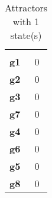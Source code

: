 

\begin{table}[ht]
\begin{center}
\caption{Attractors with 1 state(s)}
\begin{tabularx}{\linewidth}{l>{\centering\arraybackslash}X}\hline
	&	 \multicolumn{1}{c}{Attr. 1} \\
\textbf{g1}	&	\cellcolor[gray]{0.6}0\\
\textbf{g2}	&	\cellcolor[gray]{0.6}0\\
\textbf{g3}	&	\cellcolor[gray]{0.6}0\\
\textbf{g7}	&	\cellcolor[gray]{0.6}0\\
\textbf{g4}	&	\cellcolor[gray]{0.6}0\\
\textbf{g6}	&	\cellcolor[gray]{0.6}0\\
\textbf{g5}	&	\cellcolor[gray]{0.6}0\\
\textbf{g8}	&	\cellcolor[gray]{0.6}0\\
\hline\end{tabularx}
\end{center}
\end{table}

